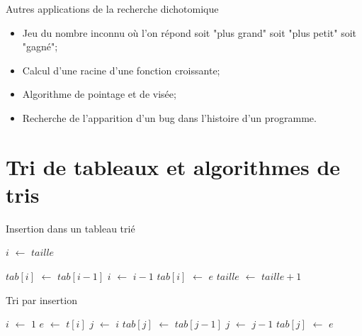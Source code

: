 \documentclass[10pt,xcolor=dvipsnames]{beamer}
\newcommand*\Let[2]{\State #1 $\gets$ #2}
\begin{document}
\begin{frame}{Autres applications de la recherche dichotomique}

\begin{itemize}
    \item Jeu du nombre inconnu où l'on répond soit "plus grand" soit "plus petit" soit "gagné";
    \item Calcul d'une racine d'une fonction croissante;
    \item Algorithme de pointage et de visée;
    \item Recherche de l'apparition d'un bug dans l'histoire d'un programme.
\end{itemize}
\end{frame}

\section{Tri de tableaux et algorithmes de tris}

\begin{frame}{Insertion dans un tableau trié}
    \begin{tcolorbox}
  \begin{algorithmic}[1]
    \Let{$i$}{$taille$}

        \Let{$tab[i]$}{$tab[i - 1]$}
        \Let{$i$}{$i - 1$}
    \EndWhile
    \Let{$tab[i]$}{$e$}
    \Let{$taille$}{$taille + 1$}
    \EndFunction
  \end{algorithmic}
\end{tcolorbox}


\end{frame}

\begin{frame}{Tri par insertion}
    \begin{tcolorbox}
  \begin{algorithmic}[1]
    \Let{$i$}{$1$}
        \Let{$e$}{$t[i]$}
        \Let{$j$}{$i$}
            \Let{$tab[j]$}{$tab[j - 1]$}
            \Let{$j$}{$j - 1$}
        \EndWhile
        \Let{$tab[j]$}{$e$}
    \EndFor
    \EndFunction
  \end{algorithmic}
\end{tcolorbox}


\end{frame}
\end{document}
